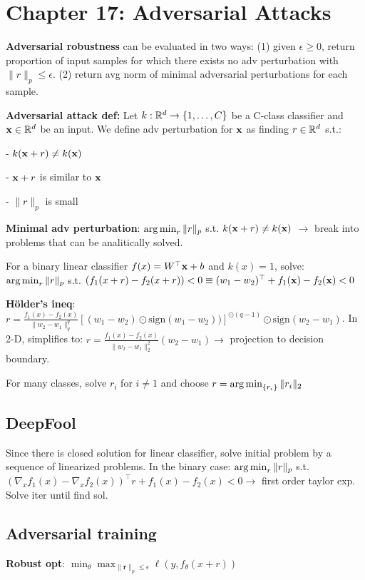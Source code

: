 \section*{Chapter 17: Adversarial Attacks}

\textbf{Adversarial robustness} can be evaluated in two ways: (1) given $\epsilon \geq 0$, return proportion of input samples for which there exists no adv perturbation with $\|r\|_p \leq \epsilon$. (2) return avg norm of minimal adversarial perturbations for each sample.

\textbf{Adversarial attack def: } Let $k : \mathbb{R}^d \to \{1, \hdots, C\}$ be a C-class classifier and $\mathbf{x} \in \mathbb{R}^d$ be an input. We define adv perturbation for $\mathbf{x}$ as finding $r\in\mathbb{R}^d$ s.t.:

- $k(\mathbf{x}+r) \neq k(\mathbf{x})$

- $\mathbf{x} + r$ is similar to $\mathbf{x}$

- $\|r\|_p$ is small

\textbf{Minimal adv perturbation}: $\operatorname*{arg\,min}_r \|r\|_p$ s.t. $k(\mathbf{x}+r) \neq k(\mathbf{x})$ $\to$ break into problems that can be analitically solved.

For a binary linear classifier $f(x) = W^\top\mathbf{x} + b$ and $k(x) = 1$, solve: $\operatorname*{arg\,min}_r \|r\|_p$ s.t. $(f_1(x+r) - f_2(x+r)) < 0 \equiv (w_1-w_2)^\top + f_1(\mathbf{x}) - f_2(\mathbf{x}) < 0$

\textbf{Hölder's ineq}: $r = \frac{f_1(x) - f_2(x)}{\|w_2-w_1\|_q^q}[(w_1-w_2) \odot \text{sign}(w_1-w_2))]^{\odot(q-1)}\odot\text{sign}(w_2-w_1)$. In 2-D, simplifies to: $r = \frac{f_1(x) - f_2(x)}{\|w_2-w_1\|_2^2}(w_2-w_1) \to$ projection to decision boundary.

For many classes, solve $r_i$ for $i\neq 1$ and choose $r = \operatorname*{arg\,min}_{\{r_i\}} \|r_i\|_2$

\subsection*{DeepFool}
Since there is closed solution for linear classifier, solve initial problem by a sequence of linearized problems. In the binary case: $\operatorname*{arg\,min}_r \|r\|_p$ s.t. $(\nabla_xf_1(x) - \nabla_xf_2(x))^\top r + f_1(x) -f_2(x) < 0 \to$ first order taylor exp. Solve iter until find sol.

\subsection*{Adversarial training}

\textbf{Robust opt}: $\min_\theta \max_{\|\mathbf r\|_p\leq \epsilon} \ell(y, f_\theta(x+r))$ 

